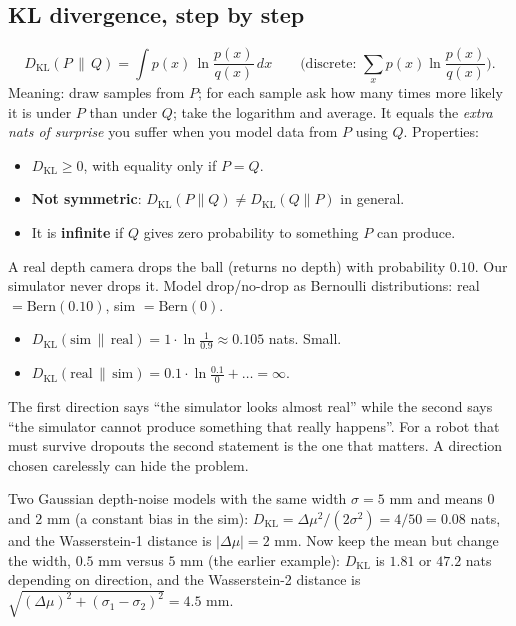 \documentclass[11pt,a4paper]{article}
\begin{document}
\subsection{KL divergence, step by step}
\[
D_{\mathrm{KL}}(P\,\|\,Q)=\int p(x)\,\ln\frac{p(x)}{q(x)}\,dx\qquad
\Big(\text{discrete: }\sum_x p(x)\ln\frac{p(x)}{q(x)}\Big).
\]
Meaning: draw samples from $P$; for each sample ask how many times more likely it is under $P$ than
under $Q$; take the logarithm and average. It equals the \emph{extra nats of surprise} you suffer
when you model data from $P$ using $Q$. Properties:
\begin{itemize}
\item $D_{\mathrm{KL}}\ge0$, with equality only if $P=Q$.
\item \textbf{Not symmetric}: $D_{\mathrm{KL}}(P\|Q)\ne D_{\mathrm{KL}}(Q\|P)$ in general.
\item It is \textbf{infinite} if $Q$ gives zero probability to something $P$ can produce.
\end{itemize}

\begin{toy}
A real depth camera drops the ball (returns no depth) with probability $0.10$. Our simulator never
drops it. Model drop/no-drop as Bernoulli distributions: real $=\mathrm{Bern}(0.10)$,
sim $=\mathrm{Bern}(0)$.
\begin{itemize}
\item $D_{\mathrm{KL}}(\text{sim}\,\|\,\text{real})=1\cdot\ln\frac{1}{0.9}\approx0.105$ nats. Small.
\item $D_{\mathrm{KL}}(\text{real}\,\|\,\text{sim})=0.1\cdot\ln\frac{0.1}{0}+\dots=\infty$.
\end{itemize}
The first direction says ``the simulator looks almost real'' while the second says ``the simulator
cannot produce something that really happens''. For a robot that must survive dropouts the second
statement is the one that matters. A direction chosen carelessly can hide the problem.
\end{toy}

\begin{toy}
Two Gaussian depth-noise models with the same width $\sigma=5$ mm and means $0$ and $2$ mm (a
constant bias in the sim): $D_{\mathrm{KL}}=\Delta\mu^2/(2\sigma^2)=4/50=0.08$ nats, and the
Wasserstein-1 distance is $|\Delta\mu|=2$ mm. Now keep the mean but change the width, $0.5$ mm
versus $5$ mm (the earlier example): $D_{\mathrm{KL}}$ is $1.81$ or $47.2$ nats depending on
direction, and the Wasserstein-2 distance is $\sqrt{(\Delta\mu)^2+(\sigma_1-\sigma_2)^2}=4.5$ mm.
\end{toy}
\end{document}
